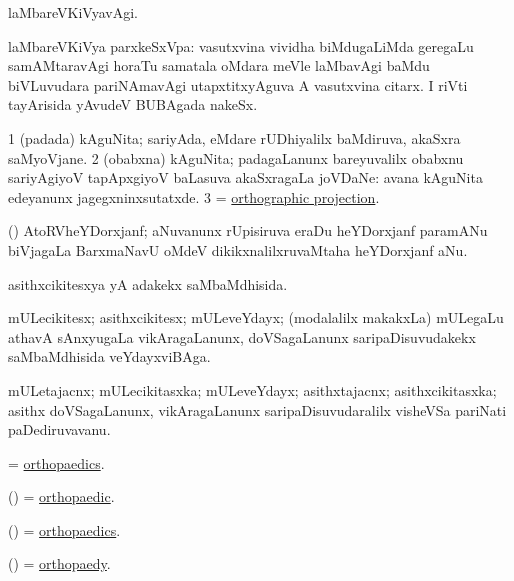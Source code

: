 \bentry
{}
\gl{\kirxvi}
\bmng
laMbareVKiVyavAgi. 
\emng
\eentry

\bentry
{}
\gl{\nA}
\bmng
laMbareVKiVya parxkeSxVpa: 
\banum
{} vasutxvina vividha biMdugaLiMda geregaLu samAMtaravAgi horaTu samatala oMdara meVle laMbavAgi baMdu biVLuvudara pariNAmavAgi utapxtitxyAguva A vasutxvina citarx. 
 I riVti tayArisida yAvudeV BUBAgada nakeSx. 
\eanum
\emng
\eentry

\bentry
{}
\gl{\nA}
\bmng
\bnum
\num{1} (padada) kAguNita; sariyAda, eMdare rUDhiyalilx baMdiruva, akaSxra saMyoVjane. 
\num{2} (obabxna) kAguNita; padagaLanunx bareyuvalilx obabxnu sariyAgiyoV tapApxgiyoV baLasuva akaSxragaLa joVDaNe:  avana kAguNita edeyanunx jagegxninxsutatxde. 
\num{3} = \hyperlink{orthographic projection}{orthographic projection}. 
\enum
\emng
\eentry

\bentry
{}
\gl{\nA}
\bmng
(\ravi) AtoRVheYDorxjanf; aNuvanunx rUpisiruva eraDu heYDorxjanf paramANu biVjagaLa BarxmaNavU oMdeV dikikxnalilxruvaMtaha heYDorxjanf aNu. 
\emng
\eentry

\bentry
{}
\gl{\gu}
\bmng
asithxcikitesxya yA adakekx saMbaMdhisida. 
\emng
\eentry

\bentry
{}
\gl{\nA}
\bmng
mULecikitesx; asithxcikitesx; mULeveYdayx; (modalalilx makakxLa) mULegaLu athavA sAnxyugaLa vikAragaLanunx, doVSagaLanunx saripaDisuvudakekx saMbaMdhisida veYdayxviBAga. 
\emng
\eentry

\bentry
{}
\gl{\nA}
\bmng
mULetajacnx; mULecikitasxka; mULeveYdayx; asithxtajacnx; asithxcikitasxka; asithx doVSagaLanunx, vikAragaLanunx saripaDisuvudaralilx visheVSa pariNati paDediruvavanu. 
\emng
\eentry

\bentry
{}
\gl{\nA}
\bmng
= \hyperlink{orthopaedics}{orthopaedics}. 
\emng
\eentry

\bentry
{}
\gl{\gu}
\bmng
(\ame) = \hyperlink{orthopaedic}{orthopaedic}. 
\emng
\eentry

\bentry
{}
\gl{\nA}
\bmng
(\ame) = \hyperlink{orthopaedics}{orthopaedics}. 
\emng
\eentry

\bentry
{}
\gl{\nA}
\bmng
(\ame) = \hyperlink{orthopaedy}{orthopaedy}. 
\emng
\eentry

